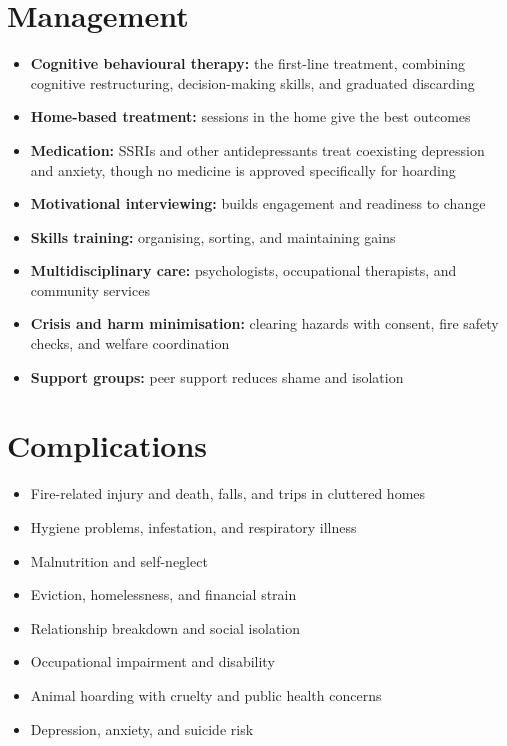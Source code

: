 \section*{Management}
\begin{itemize}
    \item \textbf{Cognitive behavioural therapy:} the first-line treatment, combining cognitive restructuring, decision-making skills, and graduated discarding
    \item \textbf{Home-based treatment:} sessions in the home give the best outcomes
    \item \textbf{Medication:} SSRIs and other antidepressants treat coexisting depression and anxiety, though no medicine is approved specifically for hoarding
    \item \textbf{Motivational interviewing:} builds engagement and readiness to change
    \item \textbf{Skills training:} organising, sorting, and maintaining gains
    \item \textbf{Multidisciplinary care:} psychologists, occupational therapists, and community services
    \item \textbf{Crisis and harm minimisation:} clearing hazards with consent, fire safety checks, and welfare coordination
    \item \textbf{Support groups:} peer support reduces shame and isolation
\end{itemize}

\section*{Complications}
\begin{itemize}
    \item Fire-related injury and death, falls, and trips in cluttered homes
    \item Hygiene problems, infestation, and respiratory illness
    \item Malnutrition and self-neglect
    \item Eviction, homelessness, and financial strain
    \item Relationship breakdown and social isolation
    \item Occupational impairment and disability
    \item Animal hoarding with cruelty and public health concerns
    \item Depression, anxiety, and suicide risk
\end{itemize}

